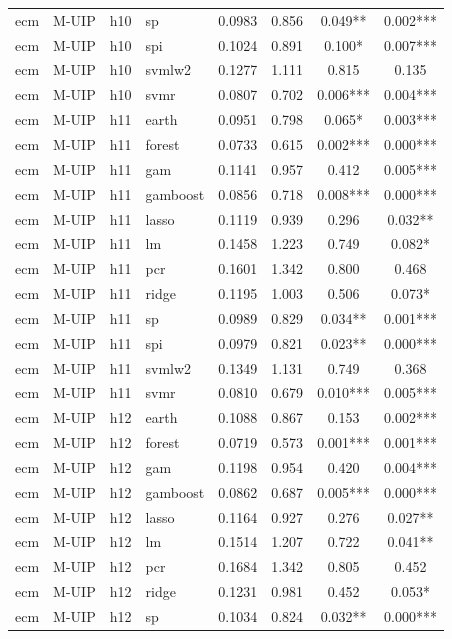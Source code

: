 \begin{ThreePartTable}
\begin{longtable}[t]{llclcccc}
ecm & M-UIP & h10 & sp & 0.0983 & 0.856 & 0.049** & 0.002***\\
ecm & M-UIP & h10 & spi & 0.1024 & 0.891 & 0.100* & 0.007***\\
ecm & M-UIP & h10 & svmlw2 & 0.1277 & 1.111 & 0.815 & 0.135\\
ecm & M-UIP & h10 & svmr & 0.0807 & 0.702 & 0.006*** & 0.004***\\
\addlinespace
ecm & M-UIP & h11 & earth & 0.0951 & 0.798 & 0.065* & 0.003***\\
ecm & M-UIP & h11 & forest & 0.0733 & 0.615 & 0.002*** & 0.000***\\
ecm & M-UIP & h11 & gam & 0.1141 & 0.957 & 0.412 & 0.005***\\
ecm & M-UIP & h11 & gamboost & 0.0856 & 0.718 & 0.008*** & 0.000***\\
ecm & M-UIP & h11 & lasso & 0.1119 & 0.939 & 0.296 & 0.032**\\
ecm & M-UIP & h11 & lm & 0.1458 & 1.223 & 0.749 & 0.082*\\
ecm & M-UIP & h11 & pcr & 0.1601 & 1.342 & 0.800 & 0.468\\
ecm & M-UIP & h11 & ridge & 0.1195 & 1.003 & 0.506 & 0.073*\\
ecm & M-UIP & h11 & sp & 0.0989 & 0.829 & 0.034** & 0.001***\\
ecm & M-UIP & h11 & spi & 0.0979 & 0.821 & 0.023** & 0.000***\\
ecm & M-UIP & h11 & svmlw2 & 0.1349 & 1.131 & 0.749 & 0.368\\
ecm & M-UIP & h11 & svmr & 0.0810 & 0.679 & 0.010*** & 0.005***\\
\addlinespace
ecm & M-UIP & h12 & earth & 0.1088 & 0.867 & 0.153 & 0.002***\\
ecm & M-UIP & h12 & forest & 0.0719 & 0.573 & 0.001*** & 0.001***\\
ecm & M-UIP & h12 & gam & 0.1198 & 0.954 & 0.420 & 0.004***\\
ecm & M-UIP & h12 & gamboost & 0.0862 & 0.687 & 0.005*** & 0.000***\\
ecm & M-UIP & h12 & lasso & 0.1164 & 0.927 & 0.276 & 0.027**\\
ecm & M-UIP & h12 & lm & 0.1514 & 1.207 & 0.722 & 0.041**\\
ecm & M-UIP & h12 & pcr & 0.1684 & 1.342 & 0.805 & 0.452\\
ecm & M-UIP & h12 & ridge & 0.1231 & 0.981 & 0.452 & 0.053*\\
ecm & M-UIP & h12 & sp & 0.1034 & 0.824 & 0.032** & 0.000***\\

\end{longtable}
\end{ThreePartTable}
